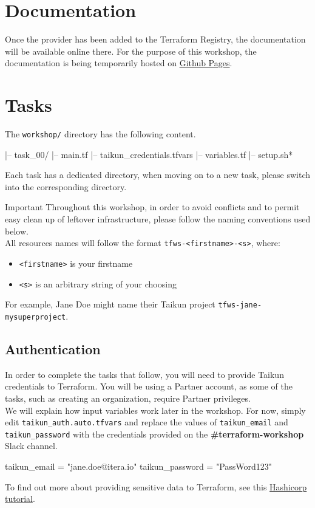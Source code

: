 \section{Documentation}
Once the provider has been added to the Terraform Registry, the documentation will be available online there.
For the purpose of this workshop, the documentation is being temporarily hosted on \href{https://intuinewin.github.io/taikun-docs/}{Github Pages}.

\section{Tasks}

The \texttt{workshop/} directory has the following content.
\begin{raw}
|-- task_00/
    |-- main.tf
    |-- taikun_credentials.tfvars
    |-- variables.tf
|-- setup.sh*
\end{raw}
Each task has a dedicated directory, when moving on to a new task, please switch into the corresponding directory.

\begin{warn}{Important}
  Throughout this workshop, in order to avoid conflicts and
  to permit easy clean up of leftover infrastructure, please follow the naming conventions used below.\\

  All resources names will follow the format \texttt{tfws-<firstname>-<s>}, where:
  \begin{itemize}
    \item \texttt{<firstname>} is your firstname
    \item \texttt{<s>} is an arbitrary string of your choosing
  \end{itemize}
  For example, Jane Doe might name their Taikun project \texttt{tfws-jane-mysuperproject}.
\end{warn}

\subsection{Authentication}
In order to complete the tasks that follow, you will need to provide Taikun credentials to Terraform.
You will be using a Partner account, as some of the tasks, such as creating an organization,
require Partner privileges.\\

We will explain how input variables work later in the workshop.
For now, simply edit \texttt{taikun\_auth.auto.tfvars}
and replace the values of \texttt{taikun\_email} and \texttt{taikun\_password}
with the credentials provided on the \textbf{\#terraform-workshop} Slack channel.
\begin{tf}
taikun_email = "jane.doe@itera.io"
taikun_password = "PassWord123"
\end{tf}
To find out more about providing sensitive data to Terraform, see this \href{https://learn.hashicorp.com/tutorials/terraform/sensitive-variables}{Hashicorp tutorial}.

